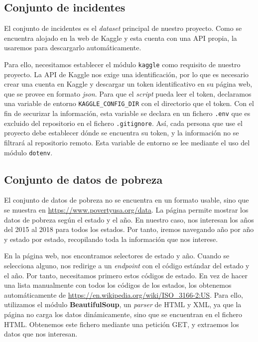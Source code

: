 \documentclass[11pt,a4paper]{article}
\begin{document}
\subsection{Conjunto de incidentes}

El conjunto de incidentes es el \textit{dataset} principal de nuestro proyecto. Como se encuentra alojado en la web de Kaggle y esta cuenta con una API propia, la usaremos para descargarlo automáticamente.

Para ello, necesitamos establecer el módulo \lstinline!kaggle! como requisito de nuestro proyecto. La API de Kaggle nos exige una identificación, por lo que es necesario crear una cuenta en Kaggle y descargar un token identificativo en su página web, que se provee en formato \textit{json}. Para que el \textit{script} pueda leer el token, declaramos una variable de entorno \lstinline!KAGGLE_CONFIG_DIR! con el directorio que el token. Con el fin de securizar la información, esta variable se declara en un fichero \lstinline!.env! que es excluido del repositorio en el fichero \lstinline!.gitignore!. Así, cada persona que use el proyecto debe establecer dónde se encuentra su token, y la información no se filtrará al repositorio remoto. Esta variable de entorno se lee mediante el uso del módulo \lstinline!dotenv!.

\subsection{Conjunto de datos de pobreza}

El conjunto de datos de pobreza no se encuentra en un formato usable, sino que se muestra en \url{https://www.povertyusa.org/data}. La página permite mostrar los datos de pobreza según el estado y el año. En nuestro caso, nos interesan los años del 2015 al 2018 para todos los estados. Por tanto, iremos navegando año por año y estado por estado, recopilando toda la información que nos interese.

En la página web, nos encontramos selectores de estado y año. Cuando se selecciona alguno, nos redirige a un \textit{endpoint} con el código estándar del estado y el año. Por tanto, necesitamos primero estos códigos de estado. En vez de hacer una lista manualmente con todos los códigos de los estados, los obtenemos automáticamente de \url{https://en.wikipedia.org/wiki/ISO_3166-2:US}. Para ello, utilizamos el módulo \textbf{BeautifulSoup}, un \textit{parser} de HTML y XML, ya que la página no carga los datos dinámicamente, sino que se encuentran en el fichero HTML. Obtenemos este fichero mediante una petición GET, y extraemos los datos que nos interesan.
\end{document}
